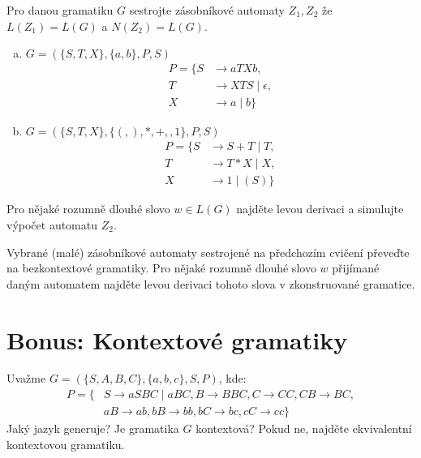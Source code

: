 \documentclass[a4paper,12pt]{amsart}
\begin{document}
\medskip\begin{problem}

    Pro danou gramatiku $G$ sestrojte zásobníkové automaty $Z_1,Z_2$ že $L(Z_1)=L(G)$ a $N(Z_2)=L(G)$.

    \bigskip

    \begin{enumerate}[(a)]\setlength\itemsep{12pt}
        \item $G=(\{S,T,X\},\{a,b\},P,S)$
            \begin{align*}
        P=\{S&\rightarrow aTXb, \\
        T&\rightarrow XTS\mid \epsilon,\\ 
        X&\rightarrow a\mid b\}
        \end{align*}
        \item $G=(\{S,T,X\},\{(,),*,+,,1\},P,S)$
            \begin{align*}
        P=\{S&\rightarrow S+T\mid T, \\
        T&\rightarrow T*X\mid X,\\ 
        X&\rightarrow 1\mid (S)\}
        \end{align*}
    \end{enumerate}

    Pro nějaké rozumně dlouhé slovo $w\in L(G)$ najděte levou derivaci a simulujte výpočet automatu $Z_2$.

\end{problem}
    

\medskip\begin{problem}

    Vybrané (malé) zásobníkové automaty sestrojené na předchozím cvičení převeďte na bezkontextové gramatiky. Pro nějaké rozumně dlouhé slovo $w$ přijímané daným automatem najděte levou derivaci tohoto slova v zkonstruované gramatice.

\end{problem}


\section*{Bonus: Kontextové gramatiky}


\medskip\begin{problem}
    
    Uvažme $G=(\{S,A,B,C\},\{a,b,c\},S,P)$, kde:
    \begin{align*}
        P=\{&S\rightarrow aSBC\mid aBC, B\rightarrow BBC,  C\rightarrow CC, CB\rightarrow BC,\\ 
        &aB\rightarrow ab, bB\rightarrow bb, bC\rightarrow bc, cC\rightarrow cc\}
    \end{align*}
    Jaký jazyk generuje? Je gramatika $G$ kontextová? Pokud ne, najděte ekvivalentní kontextovou gramatiku.
    
\end{problem}
\end{document}
